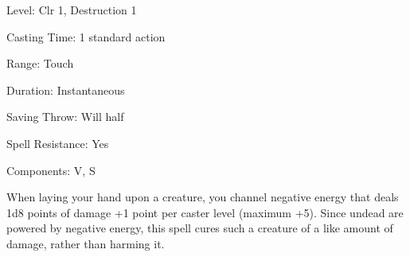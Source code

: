 
\begin{description*}
\item[Level:] Clr 1, Destruction 1
\item[Casting Time:] 1 standard action
\item[Range:] Touch
\item[Duration:] Instantaneous
\item[Saving Throw:] Will half
\item[Spell Resistance:] Yes
\item[Components:] V, S
\end{description*}

When laying your hand upon a creature, you channel negative energy that deals 1d8
points of damage +1 point per caster level (maximum +5).
Since undead are powered by negative energy, this spell cures such a creature of
a like amount of damage, rather than harming it.